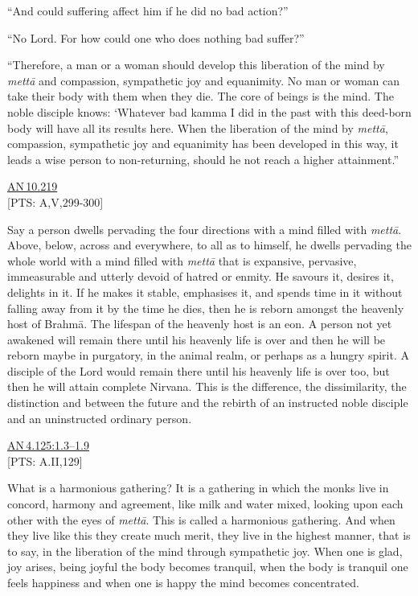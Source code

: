\documentclass[10pt, openright]{book}
\begin{document}
“And could suffering affect him if he did no bad action?”


“No Lord. For how could one who does nothing bad suffer?”


“Therefore, a man or a woman should develop this liberation of the mind by \textit{mettā} and compassion, sympathetic joy and equanimity. No man or woman can take their body with them when they die. The core of beings is the mind. The noble disciple knows: ‘Whatever bad kamma I did in the past with this deed-born body will have all its results here. When the liberation of the mind by \textit{mettā}, compassion, sympathetic joy and equanimity has been developed in this way, it leads a wise person to non-returning, should he not reach a higher attainment.”


\begin{flushright}
\href{https://suttacentral.net/an10.219/en/sujato}{AN 10.219}\\

[PTS: A,V,299-300]


\end{flushright}
Say a person dwells pervading the four directions with a mind filled with \textit{mettā}. Above, below, across and everywhere, to all as to himself, he dwells pervading the whole world with a mind filled with \textit{mettā} that is expansive, pervasive, immeasurable and utterly devoid of hatred or enmity. He savours it, desires it, delights in it. If he makes it stable, emphasises it, and spends time in it without falling away from it by the time he dies, then he is reborn amongst the heavenly host of Brahmā. The lifespan of the heavenly host is an eon. A person not yet awakened will remain there until his heavenly life is over and then he will be reborn maybe in purgatory, in the animal realm, or perhaps as a hungry spirit. A disciple of the Lord would remain there until his heavenly life is over too, but then he will attain complete Nirvana. This is the difference, the dissimilarity, the distinction and between the future and the rebirth of an instructed noble disciple and an uninstructed ordinary person.


\begin{flushright}
\href{https://suttacentral.net/an4.125/en/sujato\#1.3}{AN 4.125:1.3–1.9}\\

[PTS: A.II,129]


\end{flushright}
What is a harmonious gathering? It is a gathering in which the monks live in concord, harmony and agreement, like milk and water mixed, looking upon each other with the eyes of \textit{mettā}. This is called a harmonious gathering. And when they live like this they create much merit, they live in the highest manner, that is to say, in the liberation of the mind through sympathetic joy. When one is glad, joy arises, being joyful the body becomes tranquil, when the body is tranquil one feels happiness and when one is happy the mind becomes concentrated.
\end{document}
